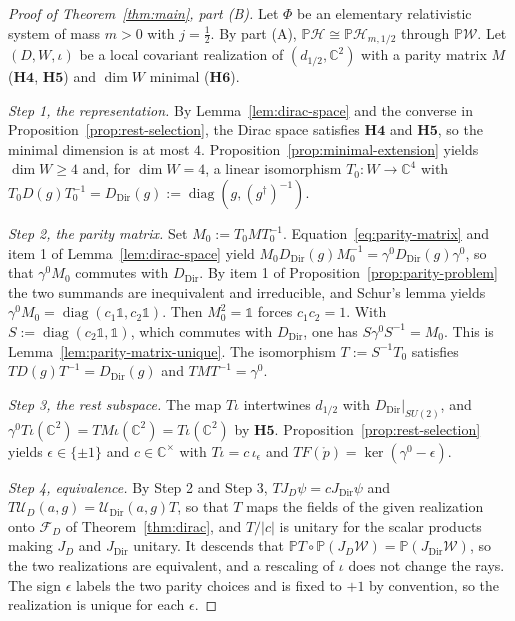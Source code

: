 \begin{proof}[Proof of Theorem~\ref{thm:main}, part (B)]
	Let $\Phi$ be an elementary relativistic system of mass $m>0$ with $j=\tfrac12$. By part (A), $\mathbb{P}\mathcal{H}\cong\mathbb{P}\mathcal{H}_{m,1/2}$ through $\mathbb{P}\mathcal{W}$. Let $(D,W,\iota)$ be a local covariant realization of $(d_{1/2},\mathbb{C}^2)$ with a parity matrix $M$ ($\mathbf{H4}$, $\mathbf{H5}$) and $\dim W$ minimal ($\mathbf{H6}$).
	
	\emph{Step 1, the representation.} By Lemma~\ref{lem:dirac-space} and the converse in Proposition~\ref{prop:rest-selection}, the Dirac space satisfies $\mathbf{H4}$ and $\mathbf{H5}$, so the minimal dimension is at most $4$. Proposition~\ref{prop:minimal-extension} yields $\dim W\geq4$ and, for $\dim W=4$, a linear isomorphism $T_0:W\to\mathbb{C}^4$ with $T_0D(g)T_0^{-1}=D_{\mathrm{Dir}}(g):=\operatorname{diag}(g,(g^\dagger)^{-1})$.
	
	\emph{Step 2, the parity matrix.} Set $M_0:=T_0MT_0^{-1}$. Equation~\eqref{eq:parity-matrix} and item 1 of Lemma~\ref{lem:dirac-space} yield $M_0D_{\mathrm{Dir}}(g)M_0^{-1}=\gamma^0D_{\mathrm{Dir}}(g)\gamma^0$, so that $\gamma^0M_0$ commutes with $D_{\mathrm{Dir}}$. By item 1 of Proposition~\ref{prop:parity-problem} the two summands are inequivalent and irreducible, and Schur's lemma yields $\gamma^0M_0=\operatorname{diag}(c_1\mathbb{1},c_2\mathbb{1})$. Then $M_0^2=\mathbb{1}$ forces $c_1c_2=1$. With $S:=\operatorname{diag}(c_2\mathbb{1},\mathbb{1})$, which commutes with $D_{\mathrm{Dir}}$, one has $S\gamma^0S^{-1}=M_0$. This is Lemma~\ref{lem:parity-matrix-unique}. The isomorphism $T:=S^{-1}T_0$ satisfies $TD(g)T^{-1}=D_{\mathrm{Dir}}(g)$ and $TMT^{-1}=\gamma^0$.
	
	\emph{Step 3, the rest subspace.} The map $T\iota$ intertwines $d_{1/2}$ with $D_{\mathrm{Dir}}|_{SU(2)}$, and $\gamma^0T\iota(\mathbb{C}^2)=TM\iota(\mathbb{C}^2)=T\iota(\mathbb{C}^2)$ by $\mathbf{H5}$. Proposition~\ref{prop:rest-selection} yields $\epsilon\in\{\pm1\}$ and $c\in\mathbb{C}^\times$ with $T\iota=c\,\iota_\epsilon$ and $TF(\mathring{p})=\ker(\gamma^0-\epsilon)$.
	
	\emph{Step 4, equivalence.} By Step 2 and Step 3, $TJ_D\psi=cJ_{\mathrm{Dir}}\psi$ and $T\mathcal{U}_D(a,g)=\mathcal{U}_{\mathrm{Dir}}(a,g)T$, so that $T$ maps the fields of the given realization onto $\mathcal{F}_D$ of Theorem~\ref{thm:dirac}, and $T/|c|$ is unitary for the scalar products making $J_D$ and $J_{\mathrm{Dir}}$ unitary. It descends that $\mathbb{P}T\circ\mathbb{P}(J_D\mathcal{W})=\mathbb{P}(J_{\mathrm{Dir}}\mathcal{W})$, so the two realizations are equivalent, and a rescaling of $\iota$ does not change the rays. The sign $\epsilon$ labels the two parity choices and is fixed to $+1$ by convention, so the realization is unique for each $\epsilon$.
	

\end{proof}
